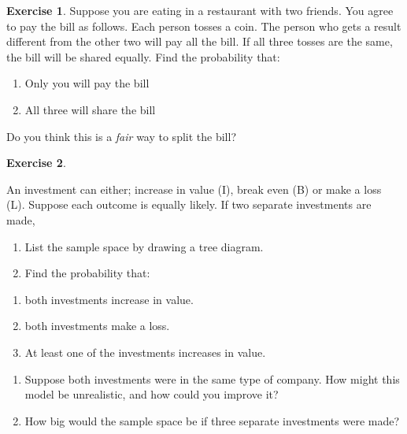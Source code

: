 \documentclass[
]{book}
\providecommand{\tightlist}{%
  \setlength{\itemsep}{0pt}\setlength{\parskip}{0pt}}
\theoremstyle{definition}
\theoremstyle{definition}
\theoremstyle{definition}
\newtheorem{exercise}{Exercise}[chapter]
\theoremstyle{definition}
\theoremstyle{remark}
\begin{document}
\begin{exercise}
Suppose you are eating in a restaurant with two friends. You agree to pay the bill as follows. Each person tosses a coin. The person who gets a result different from the other two will pay all the bill. If all three tosses are the same, the bill will be shared equally. Find the probability that:

\begin{enumerate}
\def\labelenumi{\alph{enumi})}
\tightlist
\item
  Only you will pay the bill
\item
  All three will share the bill
\end{enumerate}

Do you think this is a \emph{fair} way to split the bill?
\end{exercise}

\begin{exercise}
\protect\hypertarget{exr:invest}{}\label{exr:invest}

An investment can either; increase in value (I), break even (B) or make a loss (L). Suppose each outcome is equally likely. If two separate investments are made,

\begin{enumerate}
\def\labelenumi{\alph{enumi})}
\item
  List the sample space by drawing a tree diagram.
\item
  Find the probability that:
\end{enumerate}

\begin{enumerate}
\def\labelenumi{(\roman{enumi})}
\tightlist
\item
  both investments increase in value.
\item
  both investments make a loss.
\item
  At least one of the investments increases in value.
\end{enumerate}

\begin{enumerate}
\def\labelenumi{\alph{enumi})}
\setcounter{enumi}{2}
\tightlist
\item
  Suppose both investments were in the same type of company. How might this model be unrealistic, and how could you improve it?
\item
  How big would the sample space be if three separate investments were made?
\end{enumerate}

\end{exercise}
\end{document}
